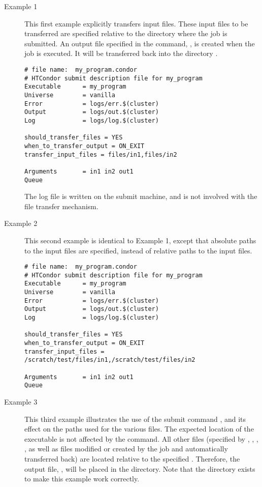 \begin{description}
\item[Example 1]

This first example explicitly transfers input files.
These input files to be transferred
are specified relative to the directory where the job is submitted.
An output file specified in the  command, ,
is created when the job is executed.
It will be transferred back into the directory .

\footnotesize
\begin{verbatim}
# file name:  my_program.condor
# HTCondor submit description file for my_program
Executable      = my_program
Universe        = vanilla
Error           = logs/err.$(cluster)
Output          = logs/out.$(cluster)
Log             = logs/log.$(cluster)

should_transfer_files = YES
when_to_transfer_output = ON_EXIT
transfer_input_files = files/in1,files/in2

Arguments       = in1 in2 out1
Queue
\end{verbatim}
\normalsize

The log file is written on the submit machine, and is not involved
with the file transfer mechanism.
\item[Example 2]

This second example is identical to Example 1,
except that absolute paths to the input files are specified,
instead of relative paths to the input files.

\footnotesize
\begin{verbatim}
# file name:  my_program.condor
# HTCondor submit description file for my_program
Executable      = my_program
Universe        = vanilla
Error           = logs/err.$(cluster)
Output          = logs/out.$(cluster)
Log             = logs/log.$(cluster)

should_transfer_files = YES
when_to_transfer_output = ON_EXIT
transfer_input_files = /scratch/test/files/in1,/scratch/test/files/in2

Arguments       = in1 in2 out1
Queue
\end{verbatim}
\normalsize

\item[Example 3]

This third example illustrates the use of the 
submit command , and its effect
on the paths used for the various files.
The expected location of the 
executable is not affected by the 
 command.
All other files
(specified by , , ,
,
as well as files modified or created by the job
and automatically transferred back)
are located relative to the specified .
Therefore, the output file, ,
will be placed in the \verb@files@ directory.
Note that the  directory
exists to make this example work correctly.


\end{description}
